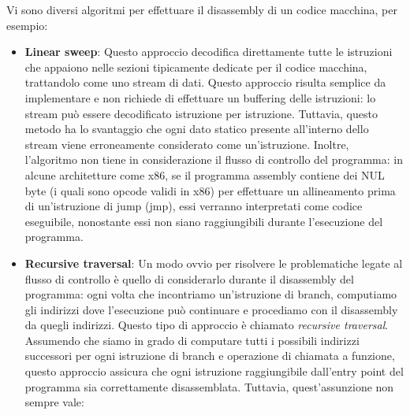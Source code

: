 \documentclass[../main.tex]{subfiles}
\begin{document}
Vi sono diversi algoritmi per effettuare il disassembly di un codice macchina, per esempio\cite{Disassembly2}:
\begin{itemize}
    \item \textbf{Linear sweep}: Questo approccio decodifica direttamente tutte le istruzioni che appaiono nelle sezioni tipicamente dedicate per il codice macchina, trattandolo come uno stream di dati. Questo approccio risulta semplice da implementare e non richiede di effettuare un buffering delle istruzioni: lo stream
    può essere decodificato istruzione per istruzione. Tuttavia, questo metodo ha lo svantaggio che ogni dato statico presente all'interno dello stream viene erroneamente considerato come un'istruzione. Inoltre, l'algoritmo non tiene in considerazione il flusso di controllo del programma: in alcune architetture come x86, se il programma assembly contiene dei NUL byte (i quali sono opcode validi in x86) per effettuare un allineamento prima
    di un'istruzione di jump (jmp), essi verranno interpretati come codice eseguibile, nonostante essi non siano raggiungibili durante l'esecuzione del programma. 
    \newpage
    \item \textbf{Recursive traversal}: Un modo ovvio per risolvere le problematiche legate al flusso di controllo è quello di considerarlo durante il disassembly del programma: ogni volta che incontriamo un'istruzione di branch, computiamo gli indirizzi dove l'esecuzione può continuare e procediamo con il disassembly da quegli indirizzi. Questo tipo di approccio è chiamato \textit{recursive traversal}. Assumendo che siamo in grado di computare tutti i possibili indirizzi successori per ogni istruzione di branch e operazione di chiamata a funzione, questo approccio assicura che ogni
    istruzione raggiungibile dall'entry point del programma sia correttamente disassemblata. Tuttavia, quest'assunzione non sempre vale: 
\end{itemize}
\end{document}
